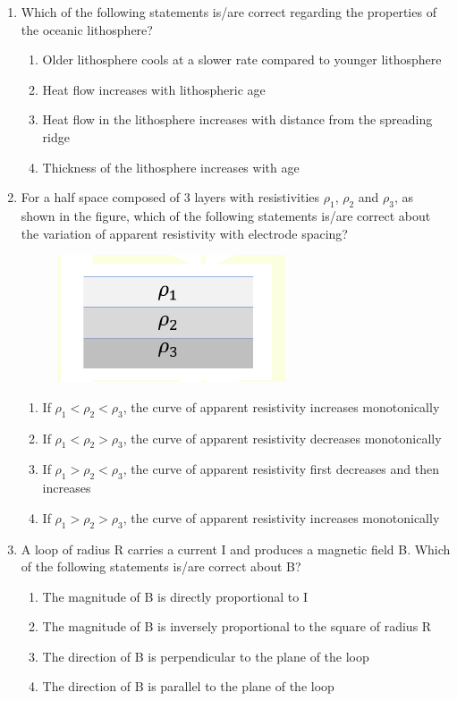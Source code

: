 \documentclass[journal,12pt,onecolumn]{IEEEtran}
\theoremstyle{remark}
\begin{document}
\begin{enumerate}
\item Which of the following statements is/are correct regarding the properties of the oceanic lithosphere? \hfill{}
\begin{enumerate}
    \item Older lithosphere cools at a slower rate compared to younger lithosphere
    \item Heat flow increases with lithospheric age
    \item Heat flow in the lithosphere increases with distance from the spreading ridge
    \item Thickness of the lithosphere increases with age
\end{enumerate}

\item For a half space composed of $3$ layers with resistivities $\rho_1$, $\rho_2$ and $\rho_3$, as shown in the figure, which of the following statements is/are correct about the variation of apparent resistivity with electrode spacing?
\begin{figure}[H]
    \centering
    \includegraphics[width=0.3\columnwidth]{figs/fig12.png}
    \caption{}
    \label{fig:q57}
\end{figure}
\hfill{}
\begin{enumerate}
    \item If $\rho_1 < \rho_2 < \rho_3$, the curve of apparent resistivity increases monotonically
    \item If $\rho_1 < \rho_2 > \rho_3$, the curve of apparent resistivity decreases monotonically
    \item If $\rho_1 > \rho_2 < \rho_3$, the curve of apparent resistivity first decreases and then increases
    \item If $\rho_1 > \rho_2 > \rho_3$, the curve of apparent resistivity increases monotonically
\end{enumerate}

\item A loop of radius R carries a current I and produces a magnetic field B. Which of the following statements is/are correct about B? \hfill{}
\begin{enumerate}
    \item The magnitude of B is directly proportional to I
    \item The magnitude of B is inversely proportional to the square of radius R
    \item The direction of B is perpendicular to the plane of the loop
    \item The direction of B is parallel to the plane of the loop
\end{enumerate}


\end{enumerate}
\end{document}
